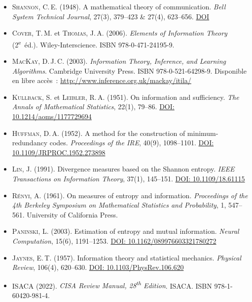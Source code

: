 \begin{itemize}

\item \textsc{Shannon}, C.\,E. (1948). A mathematical theory of communication.
\emph{Bell System Technical Journal}, 27(3), 379--423 \& 27(4), 623--656.
\href{https://doi.org/10.1002/j.1538-7305.1948.tb01338.x}{DOI}

\item \textsc{Cover}, T.\,M. et \textsc{Thomas}, J.\,A. (2006).
\emph{Elements of Information Theory} (2\textsuperscript{e}~éd.).
Wiley-Interscience. ISBN 978-0-471-24195-9.

\item \textsc{MacKay}, D.\,J.\,C. (2003).
\emph{Information Theory, Inference, and Learning Algorithms}.
Cambridge University Press. ISBN 978-0-521-64298-9.
Disponible en libre accès~: \url{http://www.inference.org.uk/mackay/itila/}

\item \textsc{Kullback}, S. et \textsc{Leibler}, R.\,A. (1951).
On information and sufficiency.
\emph{The Annals of Mathematical Statistics}, 22(1), 79--86.
\href{https://doi.org/10.1214/aoms/1177729694}{DOI: 10.1214/aoms/1177729694}

\item \textsc{Huffman}, D.\,A. (1952).
A method for the construction of minimum-redundancy codes.
\emph{Proceedings of the IRE}, 40(9), 1098--1101.
\href{https://doi.org/10.1109/JRPROC.1952.273898}{DOI: 10.1109/JRPROC.1952.273898}
\item \textsc{Lin}, J. (1991).
Divergence measures based on the Shannon entropy.
\emph{IEEE Transactions on Information Theory}, 37(1), 145--151.
\href{https://doi.org/10.1109/18.61115}{DOI: 10.1109/18.61115}

\item \textsc{Rényi}, A. (1961).
On measures of entropy and information.
\emph{Proceedings of the 4th Berkeley Symposium on Mathematical Statistics and
Probability}, 1, 547--561.
University of California Press.

\item \textsc{Paninski}, L. (2003).
Estimation of entropy and mutual information.
\emph{Neural Computation}, 15(6), 1191--1253.
\href{https://doi.org/10.1162/089976603321780272}{DOI: 10.1162/089976603321780272}

\item \textsc{Jaynes}, E.\,T. (1957).
Information theory and statistical mechanics.
\emph{Physical Review}, 106(4), 620--630.
\href{https://doi.org/10.1103/PhysRev.106.620}{DOI: 10.1103/PhysRev.106.620}

\item \textsc{ISACA} (2022).
\emph{CISA Review Manual, 28\textsuperscript{th} Edition}.
ISACA. ISBN 978-1-60420-981-4.

\end{itemize}

